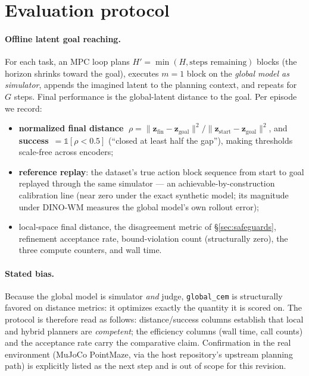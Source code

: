 \documentclass[11pt,a4paper]{article}
\newcommand{\zlat}{\mathbf{z}}
\begin{document}
\section{Evaluation protocol}
\label{sec:protocol}

\paragraph{Offline latent goal reaching.} For each task, an MPC loop plans
$H' = \min(H, \text{steps remaining})$ blocks (the horizon shrinks toward the
goal), executes $m{=}1$ block on the \emph{global model as simulator}, appends
the imagined latent to the planning context, and repeats for $G$ steps.
Final performance is the global-latent distance to the goal. Per episode we
record:
\begin{itemize}[leftmargin=1.4em]
  \item \textbf{normalized final distance}
        $\;\rho = \lVert \zlat_{\mathrm{fin}} - \zlat_{\mathrm{goal}}\rVert^2 /
                  \lVert \zlat_{\mathrm{start}} - \zlat_{\mathrm{goal}}\rVert^2$,
        and \textbf{success} $\,= \mathbb{1}[\rho < 0.5]$ (``closed at least
        half the gap''), making thresholds scale-free across encoders;
  \item \textbf{reference replay}: the dataset's true action block sequence
        from start to goal replayed through the same simulator --- an
        achievable-by-construction calibration line (near zero under the exact
        synthetic model; its magnitude under DINO-WM measures the global
        model's own rollout error);
  \item local-space final distance, the disagreement metric of
        \S\ref{sec:safeguards}, refinement acceptance rate, bound-violation
        count (structurally zero), the three compute counters, and wall time.
\end{itemize}

\paragraph{Stated bias.} Because the global model is simulator \emph{and}
judge, \texttt{global\_cem} is structurally favored on distance metrics: it
optimizes exactly the quantity it is scored on. The protocol is therefore
read as follows: distance/success columns establish that local and hybrid
planners are \emph{competent}; the efficiency columns (wall time, call
counts) and the acceptance rate carry the comparative claim. Confirmation in
the real environment (MuJoCo PointMaze, via the host repository's upstream
planning path) is explicitly listed as the next step and is out of scope for
this revision.
\end{document}
